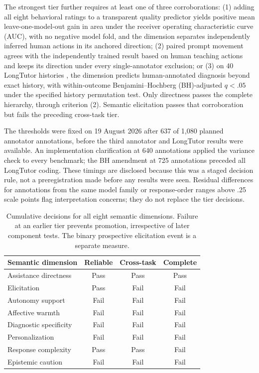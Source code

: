 The strongest tier further requires at least one of three corroborations:
(1) adding all eight behavioral ratings to a transparent quality predictor yields
positive mean leave-one-model-out gain in area under the receiver operating
characteristic curve (AUC), with no negative model fold, and
the dimension separates independently inferred human actions in its anchored
direction; (2) paired prompt movement agrees with the independently trained
result based on human teaching actions and keeps its direction under every single-annotator exclusion;
or (3) on 40 LongTutor histories \citep{li2026longtutor}, the dimension predicts
human-annotated diagnosis beyond exact history, with within-outcome Benjamini--Hochberg (BH)-adjusted
$q<.05$ under the specified history permutation test. Only directness passes
the complete hierarchy, through criterion (2). Semantic elicitation passes that
corroboration but fails the preceding cross-task tier.

The thresholds were fixed on 19 August 2026 after 637 of 1,080 planned annotator
annotations, before the third annotator and LongTutor results were available.
An implementation clarification at 640 annotations applied the variance check
to every benchmark; the BH amendment at 725 annotations preceded all LongTutor
coding. These timings are disclosed because this was a staged decision rule,
not a preregistration made before any results were seen. Residual differences for annotations from the same model family or response-order
ranges above .25 scale points flag interpretation concerns; they do not replace
the tier decisions.

\begin{table}[t]
\centering\small
\begin{tabular}{lccc}
\toprule
Semantic dimension & Reliable & Cross-task & Complete\\
\midrule
Assistance directness & Pass & Pass & Pass\\
Elicitation & Pass & Fail & Fail\\
Autonomy support & Fail & Fail & Fail\\
Affective warmth & Fail & Fail & Fail\\
Diagnostic specificity & Fail & Fail & Fail\\
Personalization & Fail & Fail & Fail\\
Response complexity & Pass & Pass & Fail\\
Epistemic caution & Fail & Fail & Fail\\
\bottomrule
\end{tabular}
\caption{Cumulative decisions for all eight semantic dimensions. Failure
at an earlier tier prevents promotion, irrespective of later component tests.
The binary prospective elicitation event is a separate measure.}
\label{tab:screen-decisions}
\end{table}

